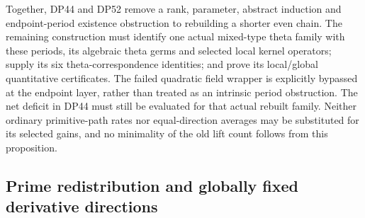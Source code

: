 \documentclass[11pt,a4paper]{article}
\theoremstyle{definition}\newtheorem{remark}[theorem]{Remark}
\begin{document}
Together, DP44 and DP52 remove a rank, parameter, abstract induction and
endpoint-period existence obstruction to rebuilding a shorter even chain.
The remaining construction must identify one actual mixed-type theta
family with these periods, its algebraic theta germs and selected local
kernel operators; supply its six theta-correspondence identities; and
prove its local/global quantitative certificates.
The failed quadratic field wrapper is explicitly bypassed at the
endpoint layer, rather than treated as an intrinsic period obstruction.
The net deficit in DP44 must still be evaluated for that actual rebuilt
family. Neither ordinary primitive-path rates nor equal-direction averages
may be substituted for its selected gains, and no minimality of the old
lift count follows from this proposition.

\subsection{Prime redistribution and globally fixed derivative directions}
\end{document}
